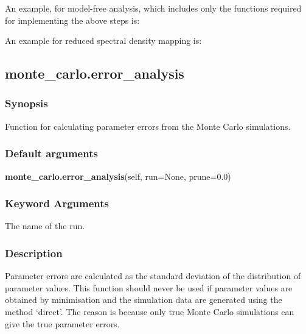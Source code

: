 An example, for model-free analysis, which includes only the functions required for
implementing the above steps is:




An example for reduced spectral density mapping is:





\newpage

\subsection{monte\_carlo.error\_analysis}


\subsubsection{Synopsis}

Function for calculating parameter errors from the Monte Carlo simulations.

\subsubsection{Default arguments}

\textsf{\textbf{monte\_carlo.error\_analysis}(self, run=None, prune=0.0)}


\subsubsection{Keyword Arguments}

  The name of the run.


\subsubsection{Description}

Parameter errors are calculated as the standard deviation of the distribution of parameter
values.  This function should never be used if parameter values are obtained by minimisation
and the simulation data are generated using the method `direct'.  The reason is because only
true Monte Carlo simulations can give the true parameter errors.

